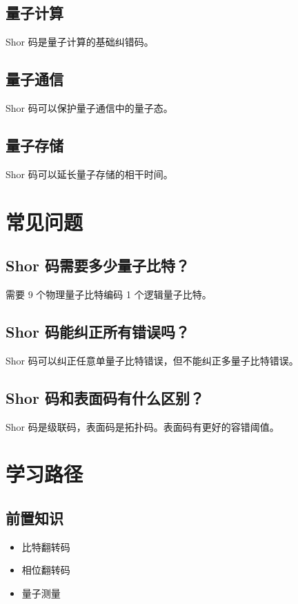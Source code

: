 \documentclass[12pt,a4paper]{article}
\begin{document}
\subsection{量子计算}

Shor 码是量子计算的基础纠错码。

\subsection{量子通信}

Shor 码可以保护量子通信中的量子态。

\subsection{量子存储}

Shor 码可以延长量子存储的相干时间。

\section{常见问题}

\subsection{Shor 码需要多少量子比特？}

需要 9 个物理量子比特编码 1 个逻辑量子比特。

\subsection{Shor 码能纠正所有错误吗？}

Shor 码可以纠正任意单量子比特错误，但不能纠正多量子比特错误。

\subsection{Shor 码和表面码有什么区别？}

Shor 码是级联码，表面码是拓扑码。表面码有更好的容错阈值。

\section{学习路径}

\subsection{前置知识}
\begin{itemize}
  \item 比特翻转码
  \item 相位翻转码
  \item 量子测量
\end{itemize}
\end{document}
